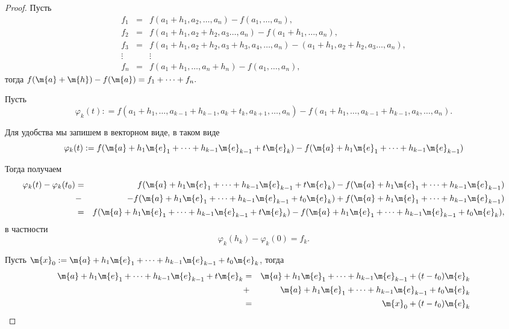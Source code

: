 \begin{proof}
    Пусть
\[
\begin{matrix}
     f_1 & = & f(a_1 + h_1, a_2, \ldots, a_n) - f(a_1, \ldots, a_n), \\
     f_2 & = & f(a_1 + h_1, a_2+h_2,a_3 \ldots, a_n) - f(a_1+h_1, \ldots, a_n),\\
     f_3 &=& f(a_1+h_1, a_2+h_2, a_3+h_3,a_4,\ldots, a_n) - (a_1 + h_1, a_2+h_2,a_3 \ldots, a_n),\\
     \vdots &  & \vdots \\
     f_n & = & f(a_1 + h_1, \ldots, a_n+h_n) - f(a_1, \ldots, a_n),
\end{matrix}
\]
тогда $f(\m{a} + \m{h}) - f(\m{a}) = f_1 + \cdots + f_n.$

Пусть 
\[
 \varphi_k(t): = f(a_1 + h_1, \ldots, a_{k-1}+h_{k-1},a_k+t_k, a_{k+1}, \ldots, a_n) - f(a_1 + h_1, \ldots, a_{k-1}+h_{k-1}, a_k,\ldots, a_n).
\]

Для удобства мы запишем в векторном виде, \ie в таком виде
\[
 \varphi_k(t): = f(\m{a} + h_1 \m{e}_1 + \cdots + h_{k-1}\m{e}_{k-1} + t\m{e}_k) - f(\m{a} + h_1 \m{e}_1 + \cdots + h_{k-1}\m{e}_{k-1})
\]

Тогда получаем
\begin{eqnarray*}
    \varphi_k(t) - \varphi_k(t_0) &=& f(\m{a} + h_1 \m{e}_1 + \cdots + h_{k-1}\m{e}_{k-1} + t\m{e}_k) - f(\m{a} + h_1 \m{e}_1 + \cdots + h_{k-1}\m{e}_{k-1}) \\
    &-& -f(\m{a} + h_1 \m{e}_1 + \cdots + h_{k-1}\m{e}_{k-1} + t_0\m{e}_k) + f(\m{a} + h_1 \m{e}_1 + \cdots + h_{k-1}\m{e}_{k-1}) \\
    &=& f(\m{a} + h_1 \m{e}_1 + \cdots + h_{k-1}\m{e}_{k-1} + t\m{e}_k) - f(\m{a} + h_1 \m{e}_1 + \cdots + h_{k-1}\m{e}_{k-1} + t_0\m{e}_k),
\end{eqnarray*}
в частности
\[
 \varphi_k(h_k) - \varphi_k(0) = f_k.
\]

Пусть $\m{x}_0 := \m{a}+ h_1 \m{e}_1 + \cdots + h_{k-1}\m{e}_{k-1}+t_0\m{e}_k$, тогда 
\begin{eqnarray*}
    \m{a} + h_1 \m{e}_1 + \cdots + h_{k-1}\m{e}_{k-1} + t\m{e}_k &=& \m{a} + h_1 \m{e}_1 + \cdots + h_{k-1}\m{e}_{k-1} + (t-t_0)\m{e}_k \\
    &+& \m{a} + h_1 \m{e}_1 + \cdots + h_{k-1}\m{e}_{k-1} + t_0\m{e}_k \\
    &=& \m{x}_0 + (t-t_0) \m{e}_k
\end{eqnarray*}


\end{proof}
